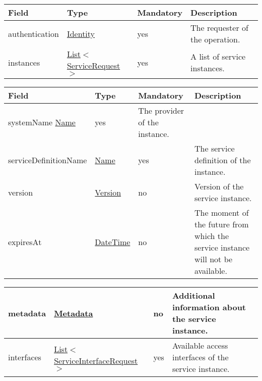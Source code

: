\documentclass[a4paper]{arrowhead}
\newcommand{\pref}[1]{{\textcolor{ArrowheadGrey}{\hyperref[sec:model:primitives:#1]{#1}}}}
\begin{document}
\label{sec:model:ServiceCreateListRequest}
 
\begin{table}[ht!]
\begin{tabularx}{\textwidth}{| p{3cm} | p{3.4cm} | p{2cm} | X |} \hline
\rowcolor{gray!33} Field & Type & Mandatory & Description \\ \hline
authentication & \hyperref[sec:model:Identity]{Identity} & yes & The requester of the operation. \\ \hline
instances & \pref{List}$<$\hyperref[sec:model:ServiceRequest]{ServiceRequest}$>$ & yes & A list of service instances. \\ \hline
\end{tabularx}
\end{table}

\label{sec:model:ServiceRequest}
 
\begin{table}[ht!]
\begin{tabularx}{\textwidth}{| p{3.5cm} | p{4.7cm} | p{2cm} | X |} \hline
\rowcolor{gray!33} Field & Type & Mandatory & Description \\ \hline
systemName \pref{Name} & yes & The provider of the instance. \\ \hline
serviceDefinitionName & \pref{Name} & yes & The service definition of the instance. \\ \hline
version & \pref{Version} & no & Version of the service instance. \\ \hline
expiresAt & \pref{DateTime} & no & The moment of the future from which the service instance will not be available. \\ \hline
\end{tabularx}
\end{table}

\begin{table}[ht!]
\begin{tabularx}{\textwidth}{| p{3.5cm} | p{4.7cm} | p{2cm} | X |} \hline
metadata &\hyperref[sec:model:Metadata]{Metadata} & no & Additional information about the service instance. \\ \hline
interfaces &  \pref{List}$<$\hyperref[sec:model:ServiceInterfaceRequest]{ServiceInterfaceRequest}$>$ & yes & Available access interfaces of the service instance.  \\ \hline
\end{tabularx}
\end{table}
\end{document}

